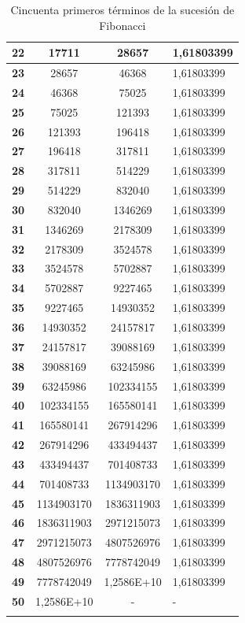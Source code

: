 \documentclass[a4paper, 11pt, spanish, twoside]{article}
\begin{document}
\begin{longtable}[H]{|c|c|c|l|}
\textbf{22} & 17711 & 28657 & 1,61803399 \\ \hline
\textbf{23} & 28657 & 46368 & 1,61803399 \\ \hline
\textbf{24} & 46368 & 75025 & 1,61803399 \\ \hline
\textbf{25} & 75025 & 121393 & 1,61803399 \\ \hline
\textbf{26} & 121393 & 196418 & 1,61803399 \\ \hline
\textbf{27} & 196418 & 317811 & 1,61803399 \\ \hline
\textbf{28} & 317811 & 514229 & 1,61803399 \\ \hline
\textbf{29} & 514229 & 832040 & 1,61803399 \\ \hline
\textbf{30} & 832040 & 1346269 & 1,61803399 \\ \hline
\textbf{31} & 1346269 & 2178309 & 1,61803399 \\ \hline
\textbf{32} & 2178309 & 3524578 & 1,61803399 \\ \hline
\textbf{33} & 3524578 & 5702887 & 1,61803399 \\ \hline
\textbf{34} & 5702887 & 9227465 & 1,61803399 \\ \hline
\textbf{35} & 9227465 & 14930352 & 1,61803399 \\ \hline
\textbf{36} & 14930352 & 24157817 & 1,61803399 \\ \hline
\textbf{37} & 24157817 & 39088169 & 1,61803399 \\ \hline
\textbf{38} & 39088169 & 63245986 & 1,61803399 \\ \hline
\textbf{39} & 63245986 & 102334155 & 1,61803399 \\ \hline
\textbf{40} & 102334155 & 165580141 & 1,61803399 \\ \hline
\textbf{41} & 165580141 & 267914296 & 1,61803399 \\ \hline
\textbf{42} & 267914296 & 433494437 & 1,61803399 \\ \hline
\textbf{43} & 433494437 & 701408733 & 1,61803399 \\ \hline
\textbf{44} & 701408733 & 1134903170 & 1,61803399 \\ \hline
\textbf{45} & 1134903170 & 1836311903 & 1,61803399 \\ \hline
\textbf{46} & 1836311903 & 2971215073 & 1,61803399 \\ \hline
\textbf{47} & 2971215073 & 4807526976 & 1,61803399 \\ \hline
\textbf{48} & 4807526976 & 7778742049 & 1,61803399 \\ \hline
\textbf{49} & 7778742049 & 1,2586E+10 & 1,61803399 \\ \hline
\textbf{50} & 1,2586E+10 & - & - \\ \hline
\caption{Cincuenta primeros términos de la sucesión de Fibonacci}
\label{tabla:fibonacci50}
\end{longtable}
\end{document}
